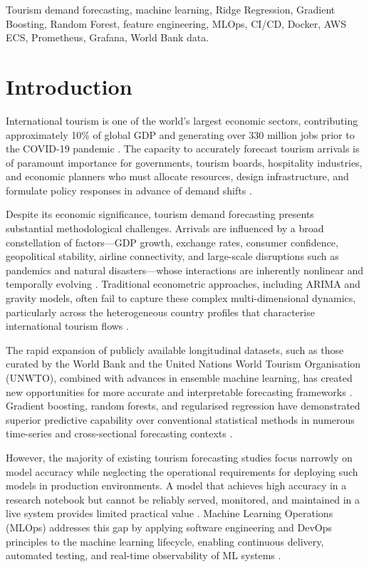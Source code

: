 \documentclass[conference]{IEEEtran}
\begin{document}
\begin{IEEEkeywords}
Tourism demand forecasting, machine learning, Ridge Regression,
Gradient Boosting, Random Forest, feature engineering, MLOps,
CI/CD, Docker, AWS ECS, Prometheus, Grafana, World Bank data.
\end{IEEEkeywords}

\section{Introduction}

International tourism is one of the world's largest economic
sectors, contributing approximately 10\% of global GDP and
generating over 330 million jobs prior to the COVID-19
pandemic \cite{unwto2020}. The capacity to accurately forecast
tourism arrivals is of paramount importance for governments,
tourism boards, hospitality industries, and economic planners
who must allocate resources, design infrastructure, and
formulate policy responses in advance of demand shifts
\cite{song2019}.

Despite its economic significance, tourism demand
forecasting presents substantial methodological challenges.
Arrivals are influenced by a broad constellation of
factors---GDP growth, exchange rates, consumer confidence,
geopolitical stability, airline connectivity, and large-scale
disruptions such as pandemics and natural disasters---whose
interactions are inherently nonlinear and temporally evolving
\cite{li2018}. Traditional econometric approaches, including
ARIMA and gravity models, often fail to capture these
complex multi-dimensional dynamics, particularly across the
heterogeneous country profiles that characterise international
tourism flows \cite{cankurt2016}.

The rapid expansion of publicly available longitudinal
datasets, such as those curated by the World Bank and the
United Nations World Tourism Organisation (UNWTO),
combined with advances in ensemble machine learning, has
created new opportunities for more accurate and interpretable
forecasting frameworks \cite{sun2019}. Gradient boosting,
random forests, and regularised regression have demonstrated
superior predictive capability over conventional statistical
methods in numerous time-series and cross-sectional
forecasting contexts \cite{chen2016}.

However, the majority of existing tourism forecasting studies
focus narrowly on model accuracy while neglecting the
operational requirements for deploying such models in
production environments. A model that achieves high accuracy
in a research notebook but cannot be reliably served,
monitored, and maintained in a live system provides limited
practical value \cite{sculley2015}. Machine Learning Operations
(MLOps) addresses this gap by applying software engineering
and DevOps principles to the machine learning lifecycle,
enabling continuous delivery, automated testing, and
real-time observability of ML systems \cite{kreuzberger2023}.
\end{document}
